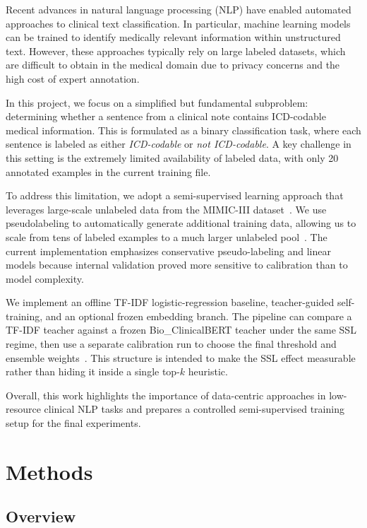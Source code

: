 \documentclass[journal]{IEEEtran}
\begin{document}
Recent advances in natural language processing (NLP) have enabled automated approaches to clinical text classification. In particular, machine learning models can be trained to identify medically relevant information within unstructured text. However, these approaches typically rely on large labeled datasets, which are difficult to obtain in the medical domain due to privacy concerns and the high cost of expert annotation.

In this project, we focus on a simplified but fundamental subproblem: determining whether a sentence from a clinical note contains ICD-codable medical information. This is formulated as a binary classification task, where each sentence is labeled as either \textit{ICD-codable} or \textit{not ICD-codable}. A key challenge in this setting is the extremely limited availability of labeled data, with only 20 annotated examples in the current training file.

To address this limitation, we adopt a semi-supervised learning approach that leverages large-scale unlabeled data from the MIMIC-III dataset~\cite{johnson2016}. We use pseudolabeling to automatically generate additional training data, allowing us to scale from tens of labeled examples to a much larger unlabeled pool~\cite{lee2013}. The current implementation emphasizes conservative pseudo-labeling and linear models because internal validation proved more sensitive to calibration than to model complexity.

We implement an offline TF-IDF logistic-regression baseline, teacher-guided self-training, and an optional frozen embedding branch. The pipeline can compare a TF-IDF teacher against a frozen Bio\_ClinicalBERT teacher under the same SSL regime, then use a separate calibration run to choose the final threshold and ensemble weights~\cite{clinicalbert}. This structure is intended to make the SSL effect measurable rather than hiding it inside a single top-$k$ heuristic.

Overall, this work highlights the importance of data-centric approaches in low-resource clinical NLP tasks and prepares a controlled semi-supervised training setup for the final experiments.

\section{Methods}

\subsection{Overview}
\end{document}
